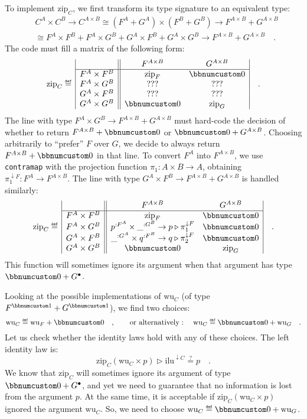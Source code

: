 To implement $\text{zip}_{C}$, we first transform its type signature
to an equivalent type:
\begin{align*}
 & C^{A}\times C^{B}\rightarrow C^{A\times B}\cong(F^{A}+G^{A})\times(F^{B}+G^{B})\rightarrow F^{A\times B}+G^{A\times B}\\
 & \cong F^{A}\times F^{B}+F^{A}\times G^{B}+G^{A}\times F^{B}+G^{A}\times G^{B}\rightarrow F^{A\times B}+G^{A\times B}\quad.
\end{align*}
The code must fill a matrix of the following form:
\[
\text{zip}_{C}\triangleq\,\begin{array}{|c||cc|}
 & F^{A\times B} & G^{A\times B}\\
\hline F^{A}\times F^{B} & \text{zip}_{F} & \bbnum 0\\
F^{A}\times G^{B} & \text{???} & \text{???}\\
G^{A}\times F^{B} & \text{???} & \text{???}\\
G^{A}\times G^{B} & \bbnum 0 & \text{zip}_{G}
\end{array}\quad.
\]
The line with type $F^{A}\times G^{B}\rightarrow F^{A\times B}+G^{A\times B}$
must hard-code the decision of whether to return $F^{A\times B}+\bbnum 0$
or $\bbnum 0+G^{A\times B}$. Choosing arbitrarily to \textsf{``}prefer\textsf{''}
$F$ over $G$, we decide to always return $F^{A\times B}+\bbnum 0$
in that line. To convert $F^{A}$ into $F^{A\times B}$, we use \lstinline!contramap!
with the projection function $\pi_{1}:A\times B\rightarrow A$, obtaining
$\pi_{1}^{\downarrow F}:F^{A}\rightarrow F^{A\times B}$. The line
with type $G^{A}\times F^{B}\rightarrow F^{A\times B}+G^{A\times B}$
is handled similarly:
\[
\text{zip}_{C}\triangleq\,\begin{array}{|c||cc|}
 & F^{A\times B} & G^{A\times B}\\
\hline F^{A}\times F^{B} & \text{zip}_{F} & \bbnum 0\\
F^{A}\times G^{B} & p^{:F^{A}}\times\_^{:G^{B}}\rightarrow p\triangleright\pi_{1}^{\downarrow F} & \bbnum 0\\
G^{A}\times F^{B} & \_^{:G^{A}}\times q^{:F^{B}}\rightarrow q\triangleright\pi_{2}^{\downarrow F} & \bbnum 0\\
G^{A}\times G^{B} & \bbnum 0 & \text{zip}_{G}
\end{array}\quad.
\]
This function will sometimes ignore its argument when that argument
has type $\bbnum 0+G^{\bullet}$.

Looking at the possible implementations of $\text{wu}_{C}$ (of type
$F^{\bbnum 1}+G^{\bbnum 1}$), we find two choices:
\[
\text{wu}_{C}\triangleq\text{wu}_{F}+\bbnum 0\quad,\quad\quad\text{or alternatively}:\quad\text{wu}_{C}\triangleq\bbnum 0+\text{wu}_{G}\quad.
\]
Let us check whether the identity laws hold with any of these choices.
The left identity law is:
\[
\text{zip}_{C}(\text{wu}_{C}\times p)\triangleright\text{ilu}^{\downarrow C}\overset{?}{=}p\quad.
\]
We know that $\text{zip}_{C}$ will sometimes ignore its argument
of type $\bbnum 0+G^{\bullet}$, and yet we need to guarantee that
no information is lost from the argument $p$. At the same time, it
is acceptable if $\text{zip}_{C}(\text{wu}_{C}\times p)$ ignored
the argument $\text{wu}_{C}$. So, we need to choose $\text{wu}_{C}\triangleq\bbnum 0+\text{wu}_{G}$. 

